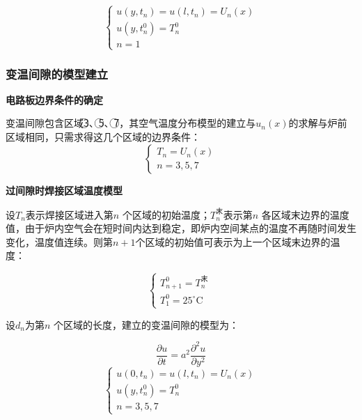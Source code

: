 \documentclass[withoutpreface,bwprint]{cumcmthesis} %
\numberwithin{equation}{subsection}
\begin{document}
\begin{equation}
	\left\{ \begin{array}{l}
		u\left(y,t_{n} \right) =u\left(l,t_{n} \right)=U_{n}(x)\\
		u\left(y,t_{n}^0 \right) =T_{n}^0\\
		n=1
	\end{array}\right.
	\label{6.8}
\end{equation}

\subsubsection{变温间隙的模型建立}

\noindent \textbf{电路板边界条件的确定}

变温间隙包含区域\textcircled{3}、\textcircled{5}、\textcircled{7}，其空气温度分布模型的建立与$u_{n}(x)$的求解与炉前区域相同，只需求得这几个区域的边界条件：
\begin{equation}
	\left\{\begin{array}{l}
		T_{n}=U_{n}(x)\\
		n=3,5,7
	\end{array}\right.
\end{equation}

\noindent \textbf{过间隙时焊接区域温度模型}

设$T_{n}$表示焊接区域进入第$𝑛$ 个区域的初始温度；$T_{n}^\text{末}$表示第$𝑛$ 各区域末边界的温度值，由于炉内空气会在短时间内达到稳定，即炉内空间某点的温度不再随时间发生变化，温度值连续。则第$𝑛 +1$个区域的初始值可表示为上一个区域末边界的温度：

\begin{equation}
	\left\{\begin{array}{l}
	T_{n+1}^{0}=T_{n}^{\text {末 }} \\
	T_{1}^{0}=25^{\circ} \mathrm{C}
	\end{array}\right.
\end{equation}

设$d_{n}$为第$𝑛$ 个区域的长度，建立的变温间隙的模型为：

$$
\frac{\partial u}{\partial t}=a^{2} \frac{\partial^{2} u}{\partial y^{2}}
$$
\begin{equation}
	\left\{\begin{array}{l}
	u\left(0, t_{n}\right)=u\left(l, t_{n}\right)=U_{n}(x) \\
	u\left(y, t_{n}^{0}\right)=T_{n}^{0} \\
	n=3,5,7
	\end{array}\right.
\end{equation}
\end{document}
